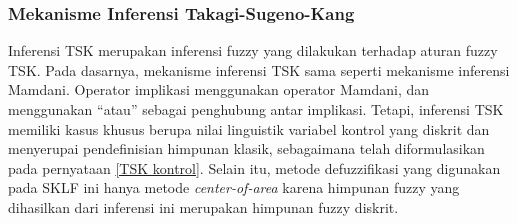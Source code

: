 \subsubsection{Mekanisme Inferensi Takagi-Sugeno-Kang}
\noindent Inferensi TSK merupakan inferensi fuzzy yang dilakukan terhadap aturan fuzzy TSK. Pada dasarnya, mekanisme inferensi TSK sama seperti mekanisme inferensi Mamdani. Operator implikasi menggunakan operator Mamdani, dan menggunakan ``atau'' sebagai penghubung antar implikasi. Tetapi, inferensi TSK memiliki kasus khusus berupa nilai linguistik variabel kontrol yang diskrit dan menyerupai pendefinisian himpunan klasik, sebagaimana telah diformulasikan pada pernyataan \ref{TSK kontrol}. Selain itu, metode defuzzifikasi yang digunakan pada SKLF ini hanya metode \emph{center-of-area} karena himpunan fuzzy yang dihasilkan dari inferensi ini merupakan himpunan fuzzy diskrit.

